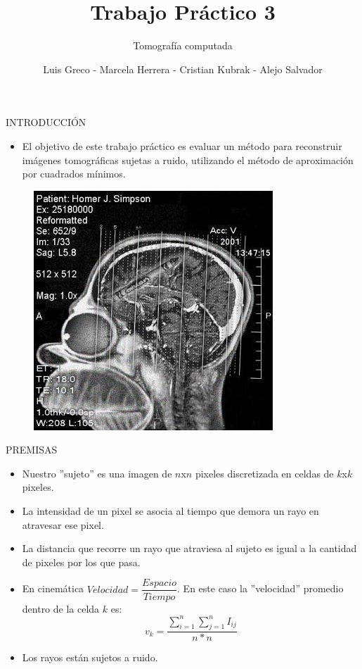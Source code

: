 \documentclass[11pt]{beamer}
\author{Luis Greco - Marcela Herrera - Cristian Kubrak - Alejo Salvador }
\title{Trabajo Práctico 3}
\subtitle{Tomografía computada}
\begin{document}
\begin{frame}
\titlepage 
\end{frame}


\begin{frame}{INTRODUCCIÓN}
\begin{itemize}
\item El objetivo de este trabajo práctico es evaluar un método para reconstruir imágenes tomográficas sujetas a ruido, utilizando el método de aproximación por cuadrados mínimos.
\end{itemize}
\begin{figure}[H]
    \centering
    \includegraphics[scale=0.4]{img/photo_2018-07-05_14-34-53.jpg}
    \label{fig:homero}
\end{figure}
\end{frame}

\begin{frame}{PREMISAS}
\begin{itemize}
\item Nuestro ''sujeto'' es una imagen de $n$x$n$ pixeles discretizada en celdas de $k$x$k$ pixeles.
\item La intensidad de un pixel se asocia al tiempo que demora un rayo en atravesar ese pixel.
\item La distancia que recorre un rayo que atraviesa al sujeto es igual a la cantidad de pixeles por los que pasa.
\item En cinemática $Velocidad = \dfrac{Espacio}{Tiempo}$. En este caso la ''velocidad'' promedio dentro de la celda $k$ es:
\begin{displaymath}
v_{k} =\dfrac{\sum_{i=1}^{n}\sum_{j=1}^{n} I_{ij}}{n*n}
\end{displaymath}
\item Los rayos están sujetos a ruido.
\end{itemize}
\end{frame}
\end{document}
